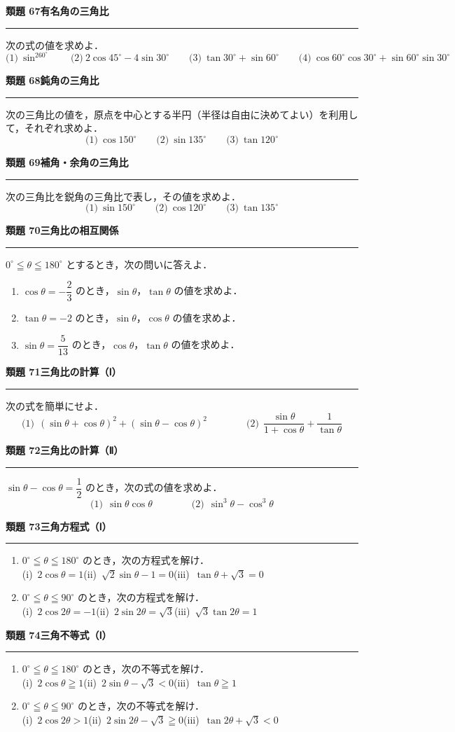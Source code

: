 \documentclass[a4paper,11pt]{ltjsarticle}
\newcommand{\mon}[2]{\Needspace{7\baselineskip}\vspace{10pt}%
  {\sffamily\bfseries 類題 #1\quad #2\par}\vspace{2pt}\hrule\vspace{4pt}}
\begin{document}
\mon{67}{有名角の三角比}
次の式の値を求めよ．
\[\text{(1)}\ \sin^260^\circ\qquad\text{(2)}\ 2\cos45^\circ-4\sin30^\circ\qquad\text{(3)}\ \tan30^\circ+\sin60^\circ\qquad\text{(4)}\ \cos60^\circ\cos30^\circ+\sin60^\circ\sin30^\circ\]

\mon{68}{鈍角の三角比}
次の三角比の値を，原点を中心とする半円（半径は自由に決めてよい）を利用して，それぞれ求めよ．
\[\text{(1)}\ \cos150^\circ\qquad\text{(2)}\ \sin135^\circ\qquad\text{(3)}\ \tan120^\circ\]

\mon{69}{補角・余角の三角比}
次の三角比を鋭角の三角比で表し，その値を求めよ．
\[\text{(1)}\ \sin150^\circ\qquad\text{(2)}\ \cos120^\circ\qquad\text{(3)}\ \tan135^\circ\]

\mon{70}{三角比の相互関係}
$0^\circ\leqq\theta\leqq180^\circ$ とするとき，次の問いに答えよ．
\begin{enumerate}
\item $\cos\theta=-\dfrac23$ のとき，$\sin\theta$，$\tan\theta$ の値を求めよ．
\item $\tan\theta=-2$ のとき，$\sin\theta$，$\cos\theta$ の値を求めよ．
\item $\sin\theta=\dfrac{5}{13}$ のとき，$\cos\theta$，$\tan\theta$ の値を求めよ．
\end{enumerate}

\mon{71}{三角比の計算（Ⅰ）}
次の式を簡単にせよ．
\[\text{(1)}\ \ (\sin\theta+\cos\theta)^2+(\sin\theta-\cos\theta)^2\qquad\qquad\text{(2)}\ \ \frac{\sin\theta}{1+\cos\theta}+\frac{1}{\tan\theta}\]

\mon{72}{三角比の計算（Ⅱ）}
$\sin\theta-\cos\theta=\dfrac12$ のとき，次の式の値を求めよ．
\[\text{(1)}\ \ \sin\theta\cos\theta\qquad\qquad\text{(2)}\ \ \sin^3\theta-\cos^3\theta\]

\mon{73}{三角方程式（Ⅰ）}
\begin{enumerate}
\item $0^\circ\leqq\theta\leqq180^\circ$ のとき，次の方程式を解け．\\
(i)\ $2\cos\theta=1$\qquad (ii)\ $\sqrt2\sin\theta-1=0$\qquad (iii)\ $\tan\theta+\sqrt3=0$
\item $0^\circ\leqq\theta\leqq90^\circ$ のとき，次の方程式を解け．\\
(i)\ $2\cos2\theta=-1$\qquad (ii)\ $2\sin2\theta=\sqrt3$\qquad (iii)\ $\sqrt3\tan2\theta=1$
\end{enumerate}

\mon{74}{三角不等式（Ⅰ）}
\begin{enumerate}
\item $0^\circ\leqq\theta\leqq180^\circ$ のとき，次の不等式を解け．\\
(i)\ $2\cos\theta\geqq1$\qquad (ii)\ $2\sin\theta-\sqrt3<0$\qquad (iii)\ $\tan\theta\geqq1$
\item $0^\circ\leqq\theta\leqq90^\circ$ のとき，次の不等式を解け．\\
(i)\ $2\cos2\theta>1$\qquad (ii)\ $2\sin2\theta-\sqrt3\geqq0$\qquad (iii)\ $\tan2\theta+\sqrt3<0$
\end{enumerate}
\end{document}
